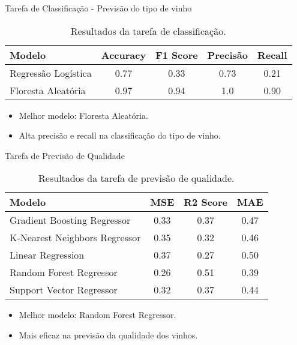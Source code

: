 \documentclass{beamer}
\begin{document}
    \begin{frame}{Tarefa de Classificação - Previsão do tipo de vinho}
        \begin{table}
            \centering
            \begin{tabular}{@{}lcccc@{}}
                \toprule
                Modelo              & Accuracy & F1 Score & Precisão & Recall \\
                \midrule
                Regressão Logística & 0.77     & 0.33     & 0.73     & 0.21   \\
                Floresta Aleatória  & 0.97     & 0.94     & 1.0      & 0.90   \\
                \bottomrule
            \end{tabular}
            \caption{Resultados da tarefa de classificação.}
            \label{tab:table2}
        \end{table}
        \begin{itemize}
            \item Melhor modelo: Floresta Aleatória.
            \item Alta precisão e recall na classificação do tipo de vinho.
        \end{itemize}
    \end{frame}

    \begin{frame}{Tarefa de Previsão de Qualidade}
        \begin{table}
            \centering
            \begin{tabular}{@{}lccc@{}}
                \toprule
                Modelo                        & MSE  & R2 Score & MAE  \\
                \midrule
                Gradient Boosting Regressor   & 0.33 & 0.37     & 0.47 \\
                K-Nearest Neighbors Regressor & 0.35 & 0.32     & 0.46 \\
                Linear Regression             & 0.37 & 0.27     & 0.50 \\
                Random Forest Regressor       & 0.26 & 0.51     & 0.39 \\
                Support Vector Regressor      & 0.32 & 0.37     & 0.44 \\
                \bottomrule
            \end{tabular}
            \caption{Resultados da tarefa de previsão de qualidade.}
            \label{tab:table}
        \end{table}
        \begin{itemize}
            \item Melhor modelo: Random Forest Regressor.
            \item Mais eficaz na previsão da qualidade dos vinhos.
        \end{itemize}
    \end{frame}
\end{document}
